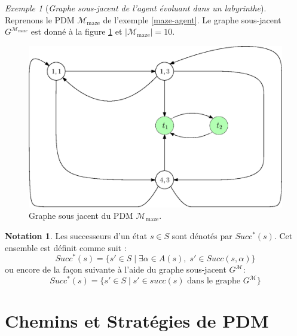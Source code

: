 \documentclass[12pt,a4paper]{report}
\theoremstyle{definition}%
\newtheorem*{notation}{Notation}
\theoremstyle{remark}
\newtheorem{example}{Exemple}[chapter]
\begin{document}
\begin{example}[\textit{Graphe sous-jacent de l'agent évoluant dans un labyrinthe}]
	Reprenons le PDM $\mathcal{M}_{\text{maze}}$ de l'exemple \ref{maze-agent}.
	Le graphe sous-jacent $G^{\mathcal{M}_{\text{maze}}}$ est donné à la figure
	\ref{graphe-maze} et $|\mathcal{M}_{\text{maze}}| = 10$.

	\begin{figure}[H]
		\centering
		\includegraphics[scale=0.5]{figures/mazePDM-graphe}
		\caption{Graphe sous jacent du PDM $\mathcal{M}_{\text{maze}}$.}
		\label{graphe-maze}
	\end{figure}

\end{example}

\begin{notation}
	Les successeurs d'un état $s \in S$ sont dénotés par $Succ^*(s)$.
	Cet ensemble est définit comme suit :
	\[
		Succ^*(s) = \{ s' \in S \; | \; \exists \alpha \in A(s), \; s' \in Succ(s, \alpha) \}
	\]
	ou encore de la façon suivante à l'aide du graphe sous-jacent
	$G^\mathcal{M}$:
	\[
		Succ^*(s) = \{ s' \in S \; | \; s' \in succ(s) \text{ dans le graphe } G^\mathcal{M} \}
	\]
\end{notation}


\section{Chemins et Stratégies de PDM}
\end{document}
